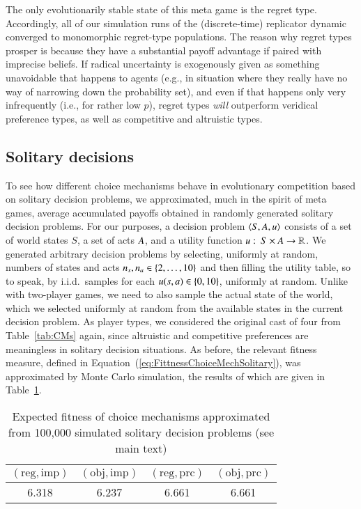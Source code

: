\documentclass[fleqn,reqno,11pt]{article}
\begin{document}
The only evolutionarily stable state of this meta game is the regret type. Accordingly, all of
our simulation runs of the (discrete-time) replicator dynamic converged to monomorphic
regret-type populations. The reason why regret types prosper is because they have a substantial
payoff advantage if paired with imprecise beliefs. If radical uncertainty is exogenously given
as something unavoidable that happens to agents (e.g., in situation where they really have no
way of narrowing down the probability set), and even if that happens only very infrequently
(i.e., for rather low $p$), regret types \emph{will} outperform veridical preference types, as
well as competitive and altruistic types.


\subsection{Solitary decisions}
\label{sec:solitary-decisions}

To see how different choice mechanisms behave in evolutionary competition based on solitary
decision problems, we approximated, much in the spirit of meta games, average accumulated
payoffs obtained in randomly generated solitary decision problems. For our purposes, a decision
problem $\left \langle S, A, u\right\rangle$ consists of a set of world states $S$, a set of acts $A$, and
a utility function $u \thinspace \colon \thinspace S \times A \rightarrow \mathbb{R}$.  We generated arbitrary
decision problems by selecting, uniformly at random, numbers of states and acts
$n_s, n_a \in \left\{2, \dots, 10\right\}$ and then filling the utility table, so to speak, by
i.i.d.~samples for each $u(s, a) \in \left\{0, 10\right\}$, uniformly at random. Unlike with
two-player games, we need to also sample the actual state of the world, which we selected
uniformly at random from the available states in the current decision problem. As player types,
we considered the original cast of four from Table~\ref{tab:CMs} again, since altruistic and
competitive preferences are meaningless in solitary decision situations. As before, the
relevant fitness measure, defined in Equation~(\ref{eq:FittnessChoiceMechSolitary}), was
approximated by Monte Carlo simulation, the results of which are given in
Table~\ref{tab:SolitaryDecisions}.

\begin{table}
  \centering
  \begin{tabular}{cccc}
    \toprule
   $(\text{reg}, \text{imp})$ 
 & $(\text{obj}, \text{imp})$ 
 & $(\text{reg}, \text{prc})$ 
 & $(\text{obj}, \text{prc})$ 
 \\ \midrule
    6.318 & 6.237 & 6.661 & 6.661 \\ \bottomrule
  \end{tabular}
  \caption{Expected fitness of choice mechanisms approximated from 100,000 simulated solitary
    decision problems (see main text)}
  \label{tab:SolitaryDecisions}
\end{table}
\end{document}
